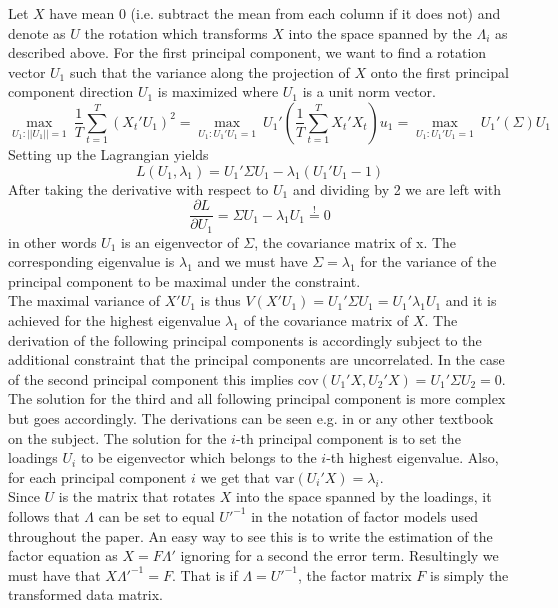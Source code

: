 \documentclass[12pt]{article}
\begin{document}
Let $X$ have mean 0 (i.e. subtract the mean from each column if it does not) and denote as $U$ the rotation which transforms $X$ into the space spanned by the $\Lambda_i$ as described above.
For the first principal component, we want to find a rotation vector $U_1$ such that the variance along the projection of $X$ onto the first principal component direction $U_1$ is maximized where $U_1$ is a unit norm vector. 
$$\underset{U_1: ||U_1|| = 1}{\max} \ \frac{1}{T} \sum_{t=1}^T(X_t'U_1)^2 = \underset{U_1: U_1'U_1 = 1}{\max} \ U_1' ( \frac{1}{T} \sum_{t=1}^T X_t'X_t )u_1 = \underset{U_1: U_1'U_1 = 1}{\max} \ U_1' (\Sigma)U_1$$
Setting up the Lagrangian yields
$$ L(U_1, \lambda_1) = U_1' \Sigma U_1 - \lambda_1(U_1'U_1-1)$$
After taking the derivative with respect to $U_1$ and dividing by 2 we are left with
$$\frac{\partial L}{\partial U_1} = \Sigma U_1 -\lambda_1 U_1 \overset{!}{=} 0$$ in other words $U_1$ is an eigenvector of $\Sigma$, the covariance matrix of x. The corresponding eigenvalue is $\lambda_1$ and we must have $\Sigma = \lambda_1$ for the variance of the principal component to be maximal under the constraint. \\
The maximal variance of $X'U_1$ is thus $V(X'U_1) = U_1' \Sigma U_1 = U_1' \lambda_1 U_1$ and it is achieved for the highest eigenvalue $\lambda_1$ of the covariance matrix of $X$. The derivation of the following principal components is accordingly subject to the additional constraint that the principal components are uncorrelated. In the case of the second principal component this implies $\text{cov}(U_1'X, U_2'X) = U_1' \Sigma U_2 = 0$. The solution for the third and all following principal component is more complex but goes accordingly. The derivations can be seen e.g. in \citet{jolliffe2005principal} or any other textbook on the subject. The solution for the $i$-th principal component is to set the loadings $U_i$ to be eigenvector which belongs to the $i$-th highest eigenvalue. Also, for each principal component $i$ we get that $\text{var}(U_i'X) = \lambda_i$. \\

Since $U$ is the matrix that rotates $X$ into the space spanned by the loadings, it follows that $\Lambda$ can be set to equal $U'^{-1}$ in the notation of factor models used throughout the paper. An easy way to see this is to write the estimation of the factor equation as $ X = F \Lambda'$ ignoring for a second the error term. Resultingly we must have that $X \Lambda'^{-1} = F$. That is if $\Lambda = U'^{-1}$, the factor matrix $F$ is simply the transformed data matrix.
\end{document}
